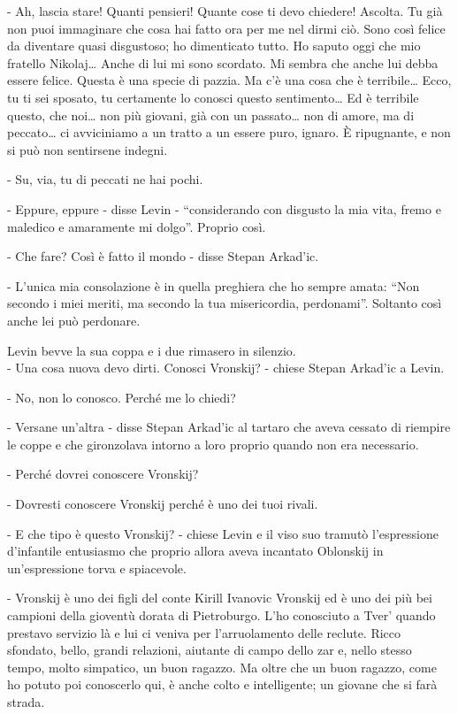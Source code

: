 - Ah, lascia stare! Quanti pensieri! Quante cose ti devo chiedere! Ascolta. Tu già non puoi immaginare che cosa hai fatto ora per me nel dirmi ciò. Sono così felice da diventare quasi disgustoso; ho dimenticato tutto. Ho saputo oggi che mio fratello Nikolaj\ldots{} Anche di lui mi sono scordato. Mi sembra che anche lui debba essere felice. Questa è una specie di pazzia. Ma c'è una cosa che è terribile\ldots{} Ecco, tu ti sei sposato, tu certamente lo conosci questo sentimento\ldots{} Ed è terribile questo, che noi\ldots{} non più giovani, già con un passato\ldots{} non di amore, ma di peccato\ldots{} ci avviciniamo a un tratto a un essere puro, ignaro. È ripugnante, e non si può non sentirsene indegni. 

- Su, via, tu di peccati ne hai pochi. 

- Eppure, eppure - disse Levin - ``considerando con disgusto la mia vita, fremo e maledico e amaramente mi dolgo''. Proprio così. 

- Che fare? Così è fatto il mondo - disse Stepan Arkad'ic. 

- L'unica mia consolazione è in quella preghiera che ho sempre amata: ``Non secondo i miei meriti, ma secondo la tua misericordia, perdonami''. Soltanto così anche lei può perdonare. 

Levin bevve la sua coppa e i due rimasero in silenzio. \\
- Una cosa nuova devo dirti. Conosci Vronskij? - chiese Stepan Arkad'ic a Levin. 

- No, non lo conosco. Perché me lo chiedi? 

- Versane un'altra - disse Stepan Arkad'ic al tartaro che aveva cessato di riempire le coppe e che gironzolava intorno a loro proprio quando non era necessario. 

- Perché dovrei conoscere Vronskij? 

- Dovresti conoscere Vronskij perché è uno dei tuoi rivali. 

- E che tipo è questo Vronskij? - chiese Levin e il viso suo tramutò l'espressione d'infantile entusiasmo che proprio allora aveva incantato Oblonskij in un'espressione torva e spiacevole. 

- Vronskij è uno dei figli del conte Kirill Ivanovic Vronskij ed è uno dei più bei campioni della gioventù dorata di Pietroburgo. L'ho conosciuto a Tver' quando prestavo servizio là e lui ci veniva per l'arruolamento delle reclute. Ricco sfondato, bello, grandi relazioni, aiutante di campo dello zar e, nello stesso tempo, molto simpatico, un buon ragazzo. Ma oltre che un buon ragazzo, come ho potuto poi conoscerlo qui, è anche colto e intelligente; un giovane che si farà strada. 


